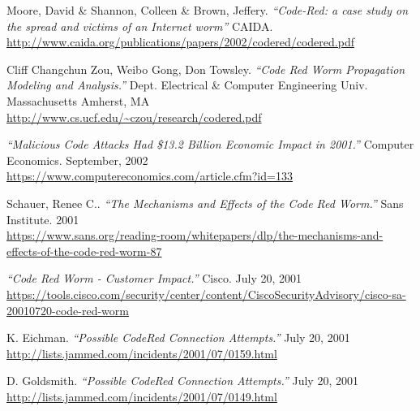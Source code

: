 \newpage
\begin{thebibliography}{99}

 Moore, David \& Shannon, Colleen \& Brown, Jeffery. 
\emph{``Code-Red: a case study on the spread and victims of an Internet worm''}
CAIDA.\\
\url{http://www.caida.org/publications/papers/2002/codered/codered.pdf}

 Cliff Changchun Zou, Weibo Gong, Don Towsley.
\emph{``Code Red Worm Propagation Modeling and Analysis.''}
Dept. Electrical \& Computer Engineering Univ. Massachusetts Amherst, MA\\
\url{http://www.cs.ucf.edu/~czou/research/codered.pdf}

\emph{``Malicious Code Attacks Had \$13.2 Billion Economic Impact in 2001.''}
Computer Economics. September, 2002\\
\url{https://www.computereconomics.com/article.cfm?id=133}

 Schauer, Renee C..
\emph{``The Mechanisms and Effects of the Code Red Worm.''}
Sans Institute. 2001\\
\url{https://www.sans.org/reading-room/whitepapers/dlp/the-mechanisms-and-effects-of-the-code-red-worm-87}

\emph{``Code Red Worm - Customer Impact.''}
Cisco. July 20, 2001\\
\url{https://tools.cisco.com/security/center/content/CiscoSecurityAdvisory/cisco-sa-20010720-code-red-worm}

 K. Eichman.
\emph{``Possible CodeRed Connection Attempts.''}
July 20, 2001\\
\url{http://lists.jammed.com/incidents/2001/07/0159.html}

 D. Goldsmith. 
\emph{``Possible CodeRed Connection Attempts.''}
July 20, 2001\\
\url{http://lists.jammed.com/incidents/2001/07/0149.html}

\end{thebibliography}

